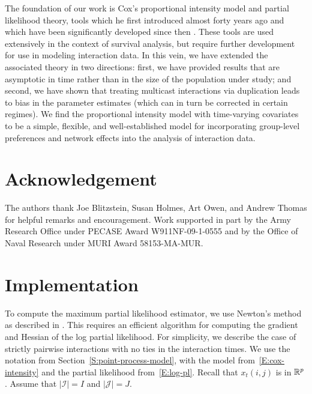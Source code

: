 \documentclass[final]{statsoc}
\begin{document}
The foundation of our work is Cox's \citeyearpar{cox1972regression}
proportional intensity model and partial likelihood theory, tools
which he first introduced almost forty years ago and which have been
significantly developed since then \citep{cox1975partial,
fleming1991counting, andersen1993statistical, martinussen2006dynamic,
cook2007statistical}. These tools are used extensively in the context
of survival analysis, but require further development for use in
modeling interaction data. In this vein, we have extended the
associated theory in two directions: first, we have provided results
that are asymptotic in time rather than in the size of the population
under study; and second, we have shown that treating multicast
interactions via duplication leads to bias in the parameter estimates
(which can in turn be corrected in certain regimes).  We find the
proportional intensity model with time-varying covariates to be a
simple, flexible, and well-established model for incorporating
group-level preferences and network effects into the analysis of
interaction data.


\section*{Acknowledgement}

The authors thank Joe Blitzstein, Susan Holmes, Art Owen, and Andrew Thomas
for helpful remarks and encouragement.
Work supported in part by the Army Research Office under
PECASE Award W911NF-09-1-0555 and by the Office of Naval
Research under MURI Award 58153-MA-MUR.


\appendix

\section{Implementation}\label{S:implementation}

To compute the maximum partial likelihood estimator, we use Newton's
method as described in \citet{boyd2004convex}.
This requires an efficient algorithm for
computing the gradient and Hessian of the log partial likelihood.  For
simplicity, we describe the case of strictly pairwise interactions with no
ties in the interaction times.  We use the notation from
Section~\ref{S:point-process-model}, with
the model from~\eqref{E:cox-intensity} and the partial likelihood
from~\eqref{E:log-pl}.  Recall that $x_t(i,j)$ is in $\mathbb{R}^p$.
Assume that $|\mathcal{I}| = I$ and $|\mathcal{J}| = J$.
\end{document}
